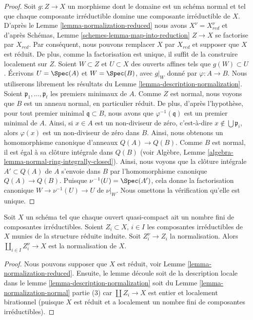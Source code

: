 \begin{proof}
\medskip\noindent
Soit $g : Z \to X$ un morphisme dont le domaine est un schéma normal
et tel que chaque composante irréductible domine une composante irréductible
de $X$. D'après le Lemme \ref{lemma-normalization-reduced} nous avons
$X^\nu = X_{red}^\nu$ et d'après Schémas, Lemme
\ref{schemes-lemma-map-into-reduction} $Z \to X$ se factorise par $X_{red}$.
Par conséquent, nous pouvons remplacer $X$ par $X_{red}$
et supposer que $X$ est réduit. De plus, comme la factorisation
est unique, il suffit de la construire localement
sur $Z$. Soient $W \subset Z$ et $U \subset X$ des
ouverts affines tels que $g(W) \subset U$. Écrivons $U = \Spec(A)$
et $W = \Spec(B)$, avec $g|_W$ donné par $\varphi : A \to B$.
Nous utiliserons librement les résultats du Lemme \ref{lemma-description-normalization}. Soient $\mathfrak p_1, \ldots, \mathfrak p_t$ les
premiers minimaux de $A$. Comme $Z$ est normal, nous voyons
que $B$ est un anneau normal, en particulier
réduit. De plus, d'après l'hypothèse, pour tout premier
minimal $\mathfrak q \subset B$, nous avons que $\varphi^{-1}(\mathfrak q)$ est un premier minimal de
$A$. Ainsi, si $x \in A$ est un non-diviseur de zéro, c'est-à-dire $x \not \in \bigcup \mathfrak p_i$,
alors $\varphi(x)$ est un non-diviseur de zéro dans $B$. Ainsi, nous
obtenons un homomorphisme canonique d'anneaux $Q(A) \to Q(B)$. Comme $B$
est normal, il est égal à sa clôture intégrale dans
$Q(B)$ (voir Algèbre, Lemme \ref{algebra-lemma-normal-ring-integrally-closed}). Ainsi, nous voyons
que la clôture intégrale $A' \subset Q(A)$ de $A$ s'envoie dans
$B$ par l'homomorphisme canonique $Q(A) \to Q(B)$.
Puisque $\nu^{-1}(U) = \Spec(A')$, cela donne la factorisation canonique
$W \to \nu^{-1}(U) \to U$ de $\nu|_W$. Nous omettons
la vérification qu'elle est unique.
\end{proof}

\begin{lemma}
\label{lemma-normalization-in-terms-of-components}
Soit $X$ un schéma tel que chaque ouvert quasi-compact
ait un nombre fini de composantes irréductibles. Soient $Z_i \subset X$,
$i \in I$ les composantes irréductibles de $X$
munies de la structure réduite induite. Soit $Z_i^\nu \to Z_i$ la normalisation.
Alors $\coprod_{i \in I} Z_i^\nu \to X$ est la normalisation de $X$.
\end{lemma}

\begin{proof}
Nous pouvons supposer que $X$ est réduit, voir Lemme \ref{lemma-normalization-reduced}.
Ensuite, le lemme découle soit de la description locale
dans le lemme \ref{lemma-description-normalization} soit du Lemme
\ref{lemma-normalization-normal} partie (3) car $\coprod Z_i \to X$ est entier et
localement birationnel (puisque $X$ est réduit et a localement
un nombre fini de composantes irréductibles).
\end{proof}

